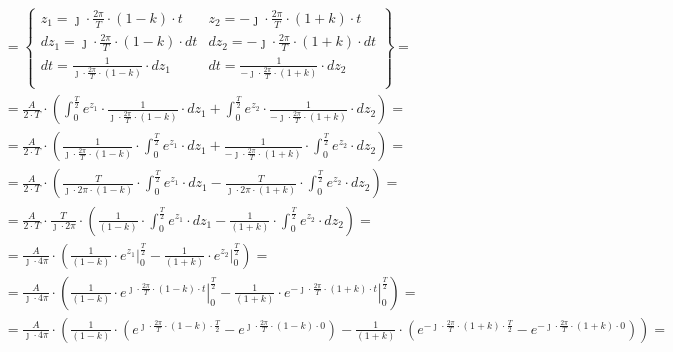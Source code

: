 \begin{task}
\begin{align*}
&=\begin{Bmatrix}
z_1=\jmath \cdot \frac{2\pi}{T} \cdot \left(1 -k\right) \cdot t & z_2=-\jmath \cdot \frac{2\pi}{T} \cdot \left(1+k\right)\cdot t\\
dz_1=\jmath \cdot \frac{2\pi}{T} \cdot \left(1 -k\right) \cdot dt & dz_2=-\jmath \cdot \frac{2\pi}{T} \cdot \left(1+k\right)\cdot dt\\
dt=\frac{1}{\jmath \cdot \frac{2\pi}{T} \cdot \left(1 -k\right)} \cdot dz_1 & dt=\frac{1}{-\jmath \cdot \frac{2\pi}{T} \cdot \left(1+k\right)}\cdot dz_2\\
\end{Bmatrix}=\\
&=\frac{A}{2\cdot T}\cdot \left( \int_{0}^{\frac{T}{2}} e^{z_1} \cdot \frac{1}{\jmath \cdot \frac{2\pi}{T} \cdot \left(1 -k\right)} \cdot dz_1 + \int_{0}^{\frac{T}{2}} e^{z_2 } \cdot \frac{1}{-\jmath \cdot \frac{2\pi}{T} \cdot \left(1+k\right)}\cdot dz_2 \right)=\\
&=\frac{A}{2\cdot T}\cdot \left( \frac{1}{\jmath \cdot \frac{2\pi}{T} \cdot \left(1 -k\right)} \cdot \int_{0}^{\frac{T}{2}} e^{z_1} \cdot dz_1 + \frac{1}{-\jmath \cdot \frac{2\pi}{T} \cdot \left(1+k\right)}\cdot \int_{0}^{\frac{T}{2}} e^{z_2 } \cdot dz_2 \right)=\\
&=\frac{A}{2\cdot T}\cdot \left( \frac{T}{\jmath \cdot 2\pi \cdot \left(1 -k\right)} \cdot \int_{0}^{\frac{T}{2}} e^{z_1} \cdot dz_1 - \frac{T}{\jmath \cdot 2\pi \cdot \left(1+k\right)}\cdot \int_{0}^{\frac{T}{2}} e^{z_2 } \cdot dz_2 \right)=\\
&=\frac{A}{2\cdot T}\cdot \frac{T}{\jmath \cdot 2\pi} \cdot \left( \frac{1}{\left(1 -k\right)} \cdot \int_{0}^{\frac{T}{2}} e^{z_1} \cdot dz_1 - \frac{1}{ \left(1+k\right)}\cdot \int_{0}^{\frac{T}{2}} e^{z_2 } \cdot dz_2 \right)=\\
&=\frac{A}{\jmath \cdot 4\pi} \cdot \left( \frac{1}{\left(1 -k\right)} \cdot \left. e^{z_1} \right|_{0}^{\frac{T}{2}} - \frac{1}{ \left(1+k\right)}\cdot \left. e^{z_2 } \right|_{0}^{\frac{T}{2}} \right)=\\
&=\frac{A}{\jmath \cdot 4\pi} \cdot \left( \frac{1}{\left(1 -k\right)} \cdot \left. e^{\jmath \cdot \frac{2\pi}{T} \cdot \left(1 -k\right) \cdot t} \right|_{0}^{\frac{T}{2}} - \frac{1}{ \left(1+k\right)}\cdot \left. e^{-\jmath \cdot \frac{2\pi}{T} \cdot \left(1+k\right)\cdot t } \right|_{0}^{\frac{T}{2}} \right)=\\
&=\frac{A}{\jmath \cdot 4\pi} \cdot \left( \frac{1}{\left(1 -k\right)} \cdot \left(e^{\jmath \cdot \frac{2\pi}{T} \cdot \left(1 -k\right) \cdot \frac{T}{2}} -e^{\jmath \cdot \frac{2\pi}{T} \cdot \left(1 -k\right) \cdot 0}\right) - \frac{1}{ \left(1+k\right)}\cdot \left( e^{-\jmath \cdot \frac{2\pi}{T} \cdot \left(1+k\right)\cdot \frac{T}{2} } - e^{-\jmath \cdot \frac{2\pi}{T} \cdot \left(1+k\right)\cdot 0 }\right) \right)=\\

\end{align*}
\end{task}
